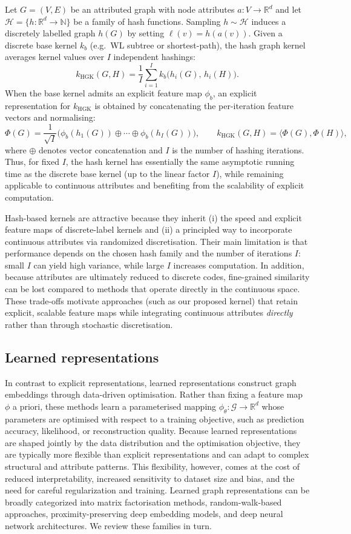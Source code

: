 Let $G=(V,E)$ be an attributed graph with node attributes
$a:V\to\mathbb{R}^d$ and let $\mathcal{H}=\{h:\mathbb{R}^d\to\mathbb{N}\}$ be a family of hash
functions. Sampling $h\sim\mathcal{H}$ induces a discretely labelled graph $h(G)$ by setting
$\ell(v)=h(a(v))$. Given a discrete base kernel $k_b$ (e.g.\ WL subtree or shortest-path),
the hash graph kernel averages kernel values over $I$ independent hashings:
\[
k_{\mathrm{HGK}}(G,H)
=
\frac{1}{I}\sum_{i=1}^{I} k_b\!\big(h_i(G),\,h_i(H)\big).
\]
When the base kernel admits an explicit feature map $\phi_b$, an explicit
representation for $k_{\mathrm{HGK}}$ is obtained by concatenating the
per-iteration feature vectors and normalising:
\[
\Phi(G)
=
\frac{1}{\sqrt{I}}
\Big(
\phi_b(h_1(G)) \oplus \cdots \oplus \phi_b(h_I(G))
\Big),
\qquad
k_{\mathrm{HGK}}(G,H)=\langle \Phi(G),\Phi(H)\rangle,
\]
where $\oplus$ denotes vector concatenation and $I$ is the number of hashing
iterations.
Thus, for fixed $I$, the hash kernel has essentially the same asymptotic running time as the
discrete base kernel (up to the linear factor $I$), while remaining applicable to continuous
attributes and benefiting from the scalability of explicit computation.

Hash-based kernels are attractive because they inherit (i) the speed and explicit feature maps
of discrete-label kernels and (ii) a principled way to incorporate continuous attributes via
randomized discretisation. Their main limitation is that performance depends on the chosen
hash family and the number of iterations $I$: small $I$ can yield high variance, while large
$I$ increases computation. In addition, because attributes are ultimately reduced to discrete
codes, fine-grained similarity can be lost compared to methods that operate directly in the
continuous space. These trade-offs motivate approaches (such as our proposed kernel) that retain
explicit, scalable feature maps while integrating continuous attributes \emph{directly} rather
than through stochastic discretisation.
\subsection{Learned representations}

In contrast to explicit representations, learned representations construct
graph embeddings through data-driven optimisation. Rather than fixing a feature
map \(\phi\) a priori, these methods learn a parameterised mapping
\(\phi_\theta : \mathcal{G} \to \mathbb{R}^d\) whose parameters are optimised with
respect to a training objective, such as prediction accuracy, likelihood, or
reconstruction quality. Because learned representations are shaped jointly by the data distribution
and the optimisation objective, they are typically more flexible than explicit
representations and can adapt to complex structural and attribute patterns.
This flexibility, however, comes at the cost of reduced interpretability,
increased sensitivity to dataset size and bias, and the need for careful
regularization and training. Learned graph representations can be broadly categorized into matrix
factorisation methods, random-walk-based approaches, proximity-preserving
deep embedding models, and deep neural network architectures. We review
these families in turn.


